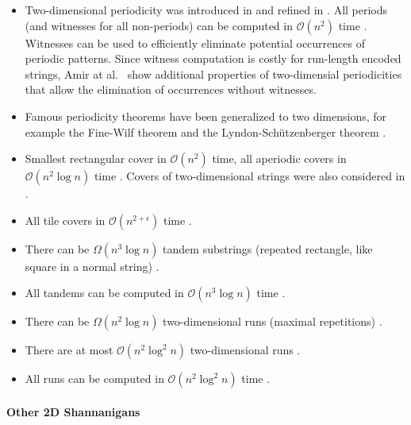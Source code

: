 \documentclass[11pt]{article}
\renewcommand{\O}{\mathcal{O}}
\theoremstyle{plain}
\theoremstyle{definition}
\theoremstyle{remark}
\begin{document}
\begin{itemize}
	\item Two-dimensional periodicity was introduced in \cite{Amir1992,Amir1998} and refined in \cite{Galil1996}. All periods (and witnesses for all non-periods) can be computed in $\O(n^2)$ time \cite{Cole2004}. Witnesses can be used to efficiently eliminate potential occurrences of periodic patterns. Since witness computation is costly for run-length encoded strings, Amir at al.\ \cite{Amir1997} show additional properties of two-dimensial periodicities that allow the elimination of occurrences without witnesses.
	\item Famous periodicity theorems have been generalized to two dimensions, for example the Fine-Wilf theorem \cite{Mignosi2003} and the Lyndon-Schützenberger theorem \cite{Gamard2017}.
	\item Smallest rectangular cover in $\O(n^2)$ time, all aperiodic covers in $\O(n^2 \log n)$ time \cite{Charalampopoulos2021}. Covers of two-dimensional strings were also considered in \cite{Gamard2019,Crochemore1998a}. 
	\item All tile covers in $\O(n^{2+\epsilon})$ time \cite{Radoszewski2022}.
	\item There can be $\Omega(n^3 \log n)$ tandem substrings (repeated rectangle, like square in a normal string) \cite{Apostolico2000}.
	\item All tandems can be computed in $\O(n^3 \log n)$ time \cite{Apostolico2005}.
	\item There can be $\Omega(n^2 \log n)$ two-dimensional runs (maximal repetitions) \cite{Gawrychowski2021}.
	\item There are at most $\O(n^2 \log^2 n)$ two-dimensional runs \cite{Charalampopoulos2020}.
	\item All runs can be computed in $\O(n^2 \log^2 n)$ time \cite{Amir2020}.

\end{itemize}


\paragraph{Other 2D Shannanigans}
\end{document}
